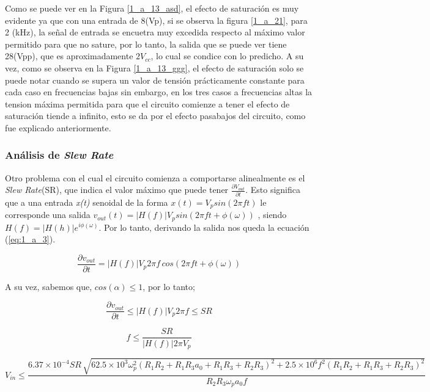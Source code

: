 Como se puede ver en la Figura \ref{1_a_13_asd}, el efecto de saturación
es muy evidente ya que con una entrada de 8(Vp), si se observa la
figura \ref{1_a_21}, para 2 (kHz), la señal de entrada se encuetra
muy excedida respecto al máximo valor permitido para que no sature,
por lo tanto, la salida que se puede ver tiene 28(Vpp), que es aproximadamente
$2V_{cc}$, lo cual se condice con lo predicho. A su vez, como se
observa en la Figura \ref{1_a_13_ggg}, el efecto de saturación solo
se puede notar cuando se supera un valor de tensión prácticamente
constante para cada caso en frecuencias bajas sin embargo, en los
tres casos a frecuencias altas la tension máxima permitida para que
el circuito comienze a tener el efecto de saturación tiende a infinito,
esto se da por el efecto pasabajos del circuito, como fue explicado
anteriormente.

\subsubsection{Análisis de \emph{Slew Rate}}

Otro problema con el cual el circuito comienza a comportarse alinealmente
es el \emph{Slew Rate}(SR), que indica el valor máximo que puede tener
$\frac{\partial V_{out}}{\partial t}$. Esto significa que a una entrada
\emph{x(t) }senoidal de la forma $x(t)=V_{p}sin(2\pi ft)$ le corresponde
una salida $v_{out}(t)=\left|H(f)\right|V_{p}sin(2\pi ft+\phi(\omega))$
, siendo $H(f)=\left|H(h)\right|e^{i\phi(\omega)}$. Por lo tanto,
derivando la salida nos queda la ecuación (\ref{eq:1_a_3}).

\begin{equation}
\frac{\partial v_{out}}{\partial t}=\left|H(f)\right|V_{p}2\pi f\,cos\left(2\pi ft+\phi(\omega)\right)\label{eq:1_a_3}
\end{equation}

A su vez, sabemos que, $cos(\alpha)\leq1$, por lo tanto;

\[
\frac{\partial v_{out}}{\partial t}\leq\left|H(f)\right|V_{p}2\pi f\leq SR
\]

\begin{equation}
f\leq\frac{SR}{\left|H(f)\right|2\pi V_{p}}\label{eq:1_a_4}
\end{equation}

\[
V_{in}\leq\frac{6.37\times10^{-4}SR\,\sqrt{62.5\times10^{3}\omega_{p}^{2}\left(R_{1}R_{2}+R_{1}R_{3}a_{0}+R_{1}R_{3}+R_{2}R_{3}\right)^{2}+2.5\times10^{6}f^{2}\left(R_{1}R_{2}+R_{1}R_{3}+R_{2}R_{3}\right)^{2}}}{R_{2}R_{3}\omega_{p}a_{0}f}
\]

